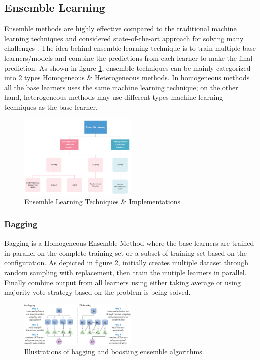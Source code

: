 \documentclass[twoside,11pt,a4paper]{article}
\begin{document}
\subsection{Ensemble Learning}
Ensemble methods are highly effective compared to the traditional machine learning techniques and considered state-of-the-art approach for solving many challenges \citep{sagi2018ensemble}. The idea behind ensemble learning technique is to train multiple base learners/models and combine the predictions from each learner to make the final prediction. As shown in figure \ref{fig:ensemble_learning}, ensemble techniques can be mainly categorized into 2 types Homogeneous \& Heterogeneous methods. In homogeneous methods all the base learners uses the same machine learning technique; on the other hand, heterogeneous methods may use different types machine learning techniques as the base learner.
\begin{figure}[ht]
	\centering
	\includegraphics[width=0.5\textwidth]{ensemble_learning}
	\caption[Ensemble Learning Techniques]{Ensemble Learning Techniques \& Implementations}
	\label{fig:ensemble_learning}
\end{figure}
\subsubsection{Bagging}
Bagging is a Homogeneous Ensemble Method where the base learners are trained in parallel on the complete training set or a subset of training set based on the configuration. As depicted in figure \ref{fig:bagging_boosting}, initially creates multiple dataset through random sampling with replacement, then train the mutiple learners in parallel. Finally combine output from all learners using either taking average or using majority vote strategy based on the problem is being solved. 
\begin{figure}[ht]
	\centering
	\includegraphics[width=0.5\textwidth]{bagging_boosting}
	\caption[Illustrations of bagging and boosting ensemble algorithms.]{Illustrations of bagging and boosting ensemble algorithms\citep{yang2019concepts}.}
	\label{fig:bagging_boosting}
\end{figure}
\end{document}
